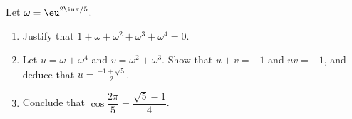 \begin{exercise}[$\star\star\star$]\label{exo:tle:complex:10}
Let $\omega = \eu^{2\iu\pi/5}$.
\begin{enumerate}
  \item Justify that $1 + \omega + \omega^2 + \omega^3 + \omega^4 = 0$.
  \item Let $u = \omega + \omega^4$ and $v = \omega^2 + \omega^3$. Show that
        $u + v = -1$ and $uv = -1$, and deduce that $u = \frac{-1+\sqrt5}{2}$.
  \item Conclude that $\cos\dfrac{2\pi}{5} = \dfrac{\sqrt5 - 1}{4}$.
\end{enumerate}
\end{exercise}
